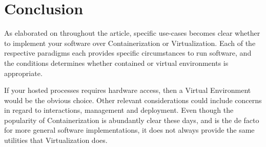 \documentclass[a4paper,10pt]{article}
\begin{document}
	
	\section{Conclusion}
	As elaborated on throughout the article, specific use-cases becomes clear whether to implement your software over Containerization or Virtualization. Each of the respective paradigms each provides specific circumstances to run software, and the conditions determines whether contained or virtual environments is appropriate. 
	
	If your hosted processes requires hardware access, then a Virtual Environment would be the obvious choice. Other relevant considerations could include concerns in regard to interactions, management and deployment. Even though the popularity of Containerization is abundantly clear these days, and is the de facto for more general software implementations, it does not always provide the same utilities that Virtualization does.
	
		
	
\end{document}
